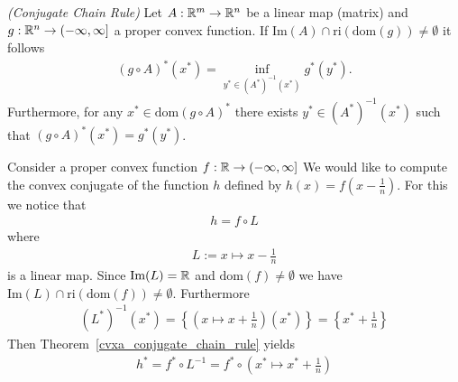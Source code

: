 \begin{theorem}
  \emph{(Conjugate Chain Rule)}
  \label{cvxa_conjugate_chain_rule}
  Let 
  $
    A:
      \mathbb{R}^m \to \mathbb{R}^n
  $
  be a linear map (matrix)
  and
  $
    g:
      \mathbb{R}^n \to (-\infty, \infty]
  $
  a proper convex function. If
  $
    \text{Im}(A) \cap \text{ri}(\text{dom}(g))
    \neq
    \emptyset
  $
  it follows
  \begin{gather}
    ( g \circ A )^* ( x^* )
    =
    \inf_
          { y^* \in ( A^* )^{ -1 } ( x^* )}
                                          g^*( y^* )
                                          .
  \end{gather}
  Furthermore, 
    for any 
      $
        x^* \in \text{dom}( g \circ A)^*
      $
        there exists
          $
            y^* \in ( A^* )^{ -1 } ( x^* )
          $
            such that
              $
                ( g \circ A)^* ( x^* )
                =
                g^*( y^* )
              $.
\end{theorem}
\begin{example}
  Consider a proper convex function
  $
    f:
    \mathbb{R} \to ( -\infty, \infty]
  $
  We would like to compute the convex conjugate of the function 
  $h$ defined by 
  $
    h(x) = f \left( x - \frac{1}{n} \right)
  $.
  For this we notice that
  \begin{gather*}
    h = f \circ L
  \end{gather*}
  where 
  \begin{gather*}
   L := x \mapsto x - \frac{1}{n} 
  \end{gather*}
  is a linear map.
  Since 
  $
    \text{Im}(L) = \mathbb{R}
  $
  and 
  $\text{dom}(f) \neq \emptyset$
  we have
  $
    \text{Im}(L) 
    \cap
    \text{ri}(\text{dom}(f) )
    \neq
    \emptyset
  $.
  Furthermore
  \begin{gather}
    (L^*)^{-1}(x^*)
    =
    \left\{ 
     \left( x \mapsto x + \frac{1}{n} \right) (x^*)
    \right\}
    =
    \left\{ x^* + \frac{1}{n} \right\}
  \end{gather}
  Then Theorem~\ref{cvxa_conjugate_chain_rule}
  yields
  \begin{gather}
    h^* = f^* \circ L^{-1} 
        =  f^* \circ  
        \left( x^* \mapsto x^* + \frac{1}{n} \right)
  \end{gather}

\end{example}




